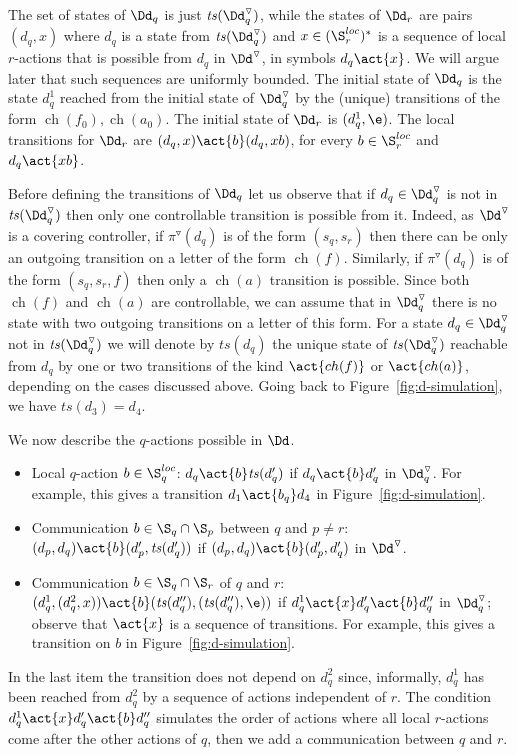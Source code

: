 \documentclass[10pt,a4paper]{article}
\newcommand{\ts}{\mathit{ts}}
\newcommand{\red}[1]{#1^\triangledown}
\newcommand{\Sloc}{\S^{loc}}
\newcommand{\ch}{\mathop{ch}}
\begin{document}
The set of states of $\Dd_q$ is just $\ts(\red\Dd_q)$, while the states of
$\Dd_r$ are pairs $(d_q,x)$ where $d_q$ is a state from
$\ts(\red\Dd_q)$ and $x \in (\Sloc_r)^*$ is a sequence of local
$r$-actions  that is possible from $d_q$ in $\red\Dd$, in
symbols $d_q\act{x}$. We will argue later that such sequences are
uniformly bounded. The
initial state of $\Dd_q$ is the state $d^1_q$ reached from the initial state
of $\red\Dd_q$ by the (unique) transitions of the form
$\ch(f_0),\ch(a_0)$. The initial state of $\Dd_r$ is $(d^1_q,\e)$. 
The local transitions for $\Dd_r$ are 
$(d_q,x)\act{b}(d_q,xb)$, for every $b\in\S^{loc}_r$
    and $d_q\act{xb}$.


Before defining the transitions of $\Dd_q$ let us observe that if 
$d_q\in\red\Dd_q$ is not in $\ts(\red\Dd_q)$ then only one
controllable transition is possible from it. Indeed, as $\red\Dd$ is a
covering controller, if $\red\pi(d_q)$ is of the form $(s_q,s_r)$ then
there can be only an outgoing transition on a letter of the form
$\ch(f)$. Similarly, if $\red\pi(d_q)$ is of the form $(s_q,s_r,f)$
then only a $\ch(a)$ transition is possible. Since both $\ch(f)$ and
$\ch(a)$ are controllable, we can assume that in $\red\Dd_q$ there is
no state with two outgoing transitions on a letter of this form. For a
state $d_q\in\red\Dd_q$ not in $\ts(\red\Dd_q)$ we will denote by
$\ts(d_q)$ the unique state of $\ts(\red\Dd_q)$ reachable from $d_q$
by one or two transitions of the kind $\act{\ch(f)}$ or $\act{\ch(a)}$,
depending on the cases discussed above. Going back to
Figure~\ref{fig:d-simulation}, we have $\ts(d_3)=d_4$. 

We now describe the $q$-actions possible in $\Dd$.
\begin{itemize}
\item Local $q$-action $b \in\Sloc_q$: $d_q\act{b} \ts(d'_q)$ if
  $d_q\act{b} d'_q$ in $\red\Dd_q$. For example, this gives a
  transition $d_1\act{b_q} d_4$ in Figure~\ref{fig:d-simulation}.


\item Communication $b \in\S_q \cap \S_p$ between $q$ and $p\not=r$: $(d_p,d_q)\act{b}
  (d'_p,\ts(d'_q))$ if $(d_p,d_q)\act{b}(d'_p,d'_q)$ in $\red\Dd$.


\item Communication $b \in\S_q \cap \S_r$ of $q$ and $r$:
  $(d^1_q,(d^2_q,x))\act{b}(\ts(d''_q),(\ts(d''_q),\e))$ 
if $d^1_q \act{x} d'_q \act{b} d''_q$ in $\red\Dd_q$;
observe that $\act{x}$ is a sequence of transitions. For example, this gives a
  transition on $b$ in Figure~\ref{fig:d-simulation}.
\end{itemize}
In the last item the transition does not depend on $d^2_q$ since,
informally, $d^1_q$ has been reached from $d^2_q$ by a sequence of
actions independent of $r$. The condition $d^1_q \act{x} d'_q \act{b}
d''_q$ simulates the order of actions where all local $r$-actions come
after the other actions of $q$, then we add a communication between
$q$ and $r$.
\end{document}
